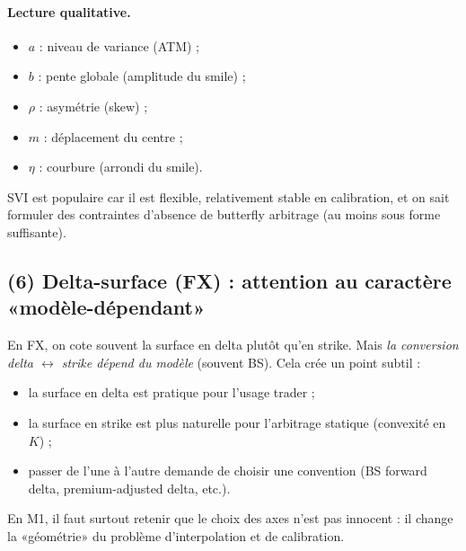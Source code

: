 \paragraph{Lecture qualitative.}
\begin{itemize}[leftmargin=*]
\item $a$ : niveau de variance (ATM) ;
\item $b$ : pente globale (amplitude du smile) ;
\item $\rho$ : asymétrie (skew) ;
\item $m$ : déplacement du centre ;
\item $\eta$ : courbure (arrondi du smile).
\end{itemize}
SVI est populaire car il est flexible, relativement stable en calibration, et on sait formuler des contraintes d'absence de butterfly arbitrage (au moins sous forme suffisante).

\subsection*{(6) Delta-surface (FX) : attention au caractère «modèle-dépendant»}
En FX, on cote souvent la surface en delta plutôt qu'en strike.
Mais \emph{la conversion delta $\leftrightarrow$ strike dépend du modèle} (souvent BS).
Cela crée un point subtil :
\begin{itemize}[leftmargin=*]
\item la surface en delta est pratique pour l'usage trader ;
\item la surface en strike est plus naturelle pour l'arbitrage statique (convexité en $K$) ;
\item passer de l'une à l'autre demande de choisir une convention (BS forward delta, premium-adjusted delta, etc.).
\end{itemize}
En M1, il faut surtout retenir que le choix des axes n'est pas innocent : il change la «géométrie» du problème d'interpolation et de calibration.
